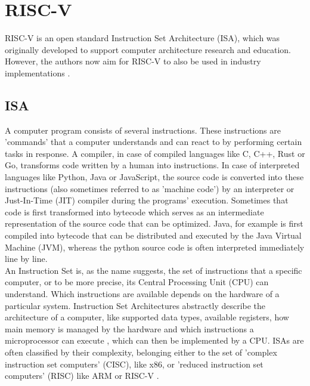 

\section{RISC-V}

RISC-V \cite{riscv} is an open standard Instruction Set Architecture (ISA), which
was originally developed to support computer architecture research and education.
However, the authors now aim for RISC-V to also be used in industry implementations \cite{riscv_spec}.

\subsection{ISA}

A computer program consists of several instructions.
These instructions are 'commands' that a computer understands and can react to by performing certain tasks in response.
A compiler, in case of compiled languages like C, C++, Rust or Go, transforms code written by a human into instructions.
In case of interpreted languages like Python, Java or JavaScript, the source code is converted into these instructions
(also sometimes referred to as 'machine code') by an interpreter or Just-In-Time (JIT) compiler during the programs' execution.
Sometimes that code is first transformed into bytecode which serves as an intermediate representation of the source code
that can be optimized.
Java, for example is first compiled into bytecode that can be distributed and executed by the Java Virtual Machine (JVM),
whereas the python source code is often interpreted immediately line by line.
\\
An Instruction Set is, as the name suggests, the set of instructions that a specific computer, or to be more precise,
its Central Processing Unit (CPU) can understand.
Which instructions are available depends on the hardware of a particular system.
Instruction Set Architectures abstractly describe the architecture of a computer,
like supported data types, available registers, how main memory is managed by the hardware and
which instructions  a microprocessor can execute \cite{isa}, which can then be implemented by a CPU.
ISAs are often classified by their complexity, belonging either to the set of 'complex instruction set computers' (CISC), like x86,
or 'reduced instruction set computers' (RISC) like ARM \cite{arm_architecture} or RISC-V \cite{riscv_spec}.

